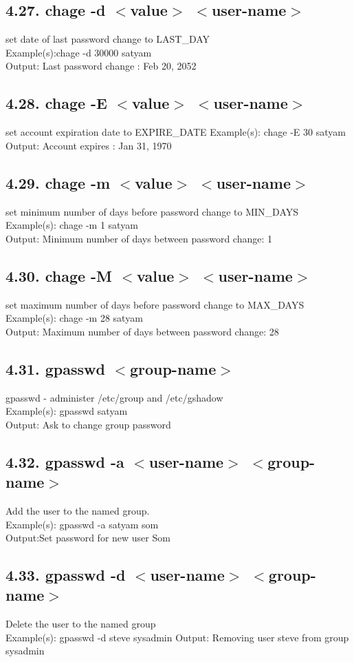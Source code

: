 \documentclass[11pt,a4]{article}
\begin{document}
\begin{enumerate}
\subsection*{4.27. chage -d $<$value$>$ $<$user-name$>$}
 set date of last password change to LAST\_DAY\\
 Example(s):chage -d 30000 satyam\\
 Output: Last password change : Feb 20, 2052
 
\subsection*{4.28. chage -E $<$value$>$ $<$user-name$>$}
set account expiration date to EXPIRE\_DATE
Example(s): chage -E 30 satyam\\
Output: Account expires	: Jan 31, 1970
\subsection*{4.29. chage -m $<$value$>$ $<$user-name$>$}
set minimum number of days before password change to MIN\_DAYS\\
Example(s): chage -m 1 satyam\\
Output: Minimum number of days between password change: 1
\subsection*{4.30. chage -M $<$value$>$ $<$user-name$>$}
set maximum number of days before password change to MAX\_DAYS\\
Example(s): chage -m 28 satyam\\
Output: Maximum number of days between password change: 28
\subsection*{4.31. gpasswd $<$group-name$>$}
gpasswd - administer /etc/group and /etc/gshadow\\
Example(s): gpasswd satyam\\
Output: Ask to change group password
\subsection*{4.32. gpasswd -a $<$user-name$>$ $<$group-name$>$}
Add the user to the named group.\\
Example(s): gpasswd -a satyam som\\
Output:Set password for new user Som
\subsection*{4.33. gpasswd -d $<$user-name$>$ $<$group-name$>$}
Delete the user to the named group\\
Example(s): gpasswd -d steve sysadmin
Output: Removing user steve from group sysadmin


\end{enumerate}
\end{document}
